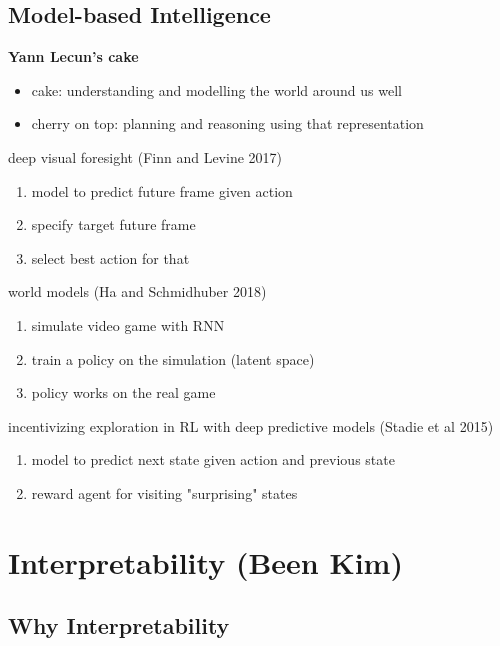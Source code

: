 \documentclass[]{article}
\theoremstyle{definition}
\begin{document}
    \subsection{Model-based Intelligence}%
    \label{sub:model_based_intelligence}

    \textbf{Yann Lecun's cake}
    \begin{itemize}
        \item cake: understanding and modelling the world around us well
        \item cherry on top: planning and reasoning using that representation
    \end{itemize}

    deep visual foresight (Finn and Levine 2017)
    \begin{enumerate}
        \item model to predict future frame given action
        \item specify target future frame
        \item select best action for that
    \end{enumerate}
    world models (Ha and Schmidhuber 2018)
    \begin{enumerate}
        \item simulate video game with RNN
        \item train a policy on the simulation (latent space)
        \item policy works on the real game
    \end{enumerate}
    incentivizing exploration in RL with deep predictive models (Stadie et al 2015)
    \begin{enumerate}
        \item model to predict next state given action and previous state
        \item reward agent for visiting "surprising" states
    \end{enumerate}



    \section{Interpretability {\small(Been Kim)}}%
    \label{sec:interpretability_small_been_kim_}

    \subsection{Why Interpretability}%
    \label{sub:introduction}
\end{document}
